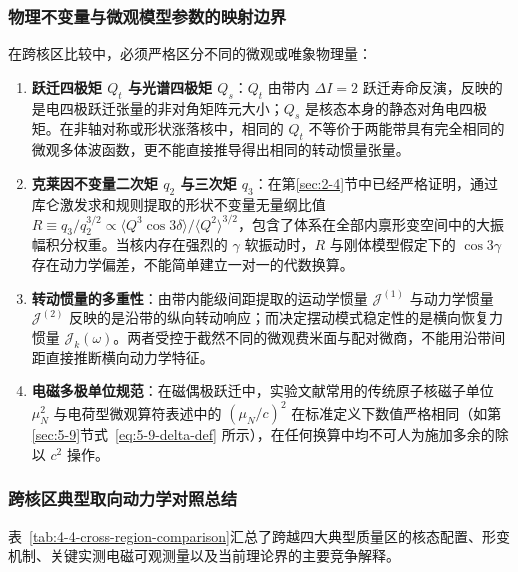 \subsubsection{物理不变量与微观模型参数的映射边界}

在跨核区比较中，必须严格区分不同的微观或唯象物理量：
\begin{enumerate}
\item \textbf{跃迁四极矩 $Q_t$ 与光谱四极矩 $Q_s$}：$Q_t$ 由带内 $\Delta I = 2$ 跃迁寿命反演，反映的是电四极跃迁张量的非对角矩阵元大小；$Q_s$ 是核态本身的静态对角电四极矩。在非轴对称或形状涨落核中，相同的 $Q_t$ 不等价于两能带具有完全相同的微观多体波函数，更不能直接推导得出相同的转动惯量张量。
\item \textbf{克莱因不变量二次矩 $q_2$ 与三次矩 $q_3$}：在第\ref{sec:2-4}节中已经严格证明，通过库仑激发求和规则提取的形状不变量无量纲比值 $R \equiv q_3 / q_2^{3/2} \propto \langle Q^3 \cos 3\delta \rangle / \langle Q^2 \rangle^{3/2}$，包含了体系在全部内禀形变空间中的大振幅积分权重。当核内存在强烈的 $\gamma$ 软振动时，$R$ 与刚体模型假定下的 $\cos 3\gamma$ 存在动力学偏差，不能简单建立一对一的代数换算。
\item \textbf{转动惯量的多重性}：由带内能级间距提取的运动学惯量 $\mathcal{J}^{(1)}$ 与动力学惯量 $\mathcal{J}^{(2)}$ 反映的是沿带的纵向转动响应；而决定摆动模式稳定性的是横向恢复力惯量 $\mathcal{J}_k(\omega)$。两者受控于截然不同的微观费米面与配对微商，不能用沿带间距直接推断横向动力学特征。
\item \textbf{电磁多极单位规范}：在磁偶极跃迁中，实验文献常用的传统原子核磁子单位 $\mu_N^2$ 与电荷型微观算符表述中的 $(\mu_N/c)^2$ 在标准定义下数值严格相同（如第\ref{sec:5-9}节式~\eqref{eq:5-9-delta-def} 所示），在任何换算中均不可人为施加多余的除以 $c^2$ 操作。
\end{enumerate}

\subsubsection{跨核区典型取向动力学对照总结}

表~\ref{tab:4-4-cross-region-comparison}汇总了跨越四大典型质量区的核态配置、形变机制、关键实测电磁可观测量以及当前理论界的主要竞争解释。

